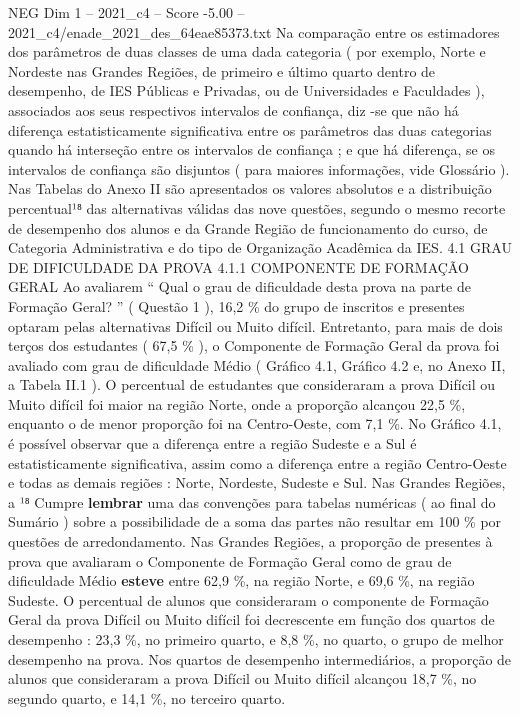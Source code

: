 \begin{textsample}{NEG Dim 1 – 2021\_c4 – Score -5.00 – 2021\_c4/enade\_2021\_des\_64eae85373.txt}
Na comparação entre os estimadores dos parâmetros de duas classes de uma dada categoria ( por exemplo, Norte e Nordeste nas Grandes Regiões, de primeiro e último quarto dentro de desempenho, de IES Públicas e Privadas, ou de Universidades e Faculdades ), associados aos seus respectivos intervalos de confiança, diz -se que não há diferença estatisticamente significativa entre os parâmetros das duas categorias quando há interseção entre os intervalos de confiança ; e que há diferença, se os intervalos de confiança são disjuntos ( para maiores informações, vide Glossário ).
Nas Tabelas do Anexo II são apresentados os valores absolutos e a distribuição percentual¹⁸ das alternativas válidas das nove questões, segundo o mesmo recorte de desempenho dos alunos e da Grande Região de funcionamento do curso, de Categoria Administrativa e do tipo de Organização Acadêmica da IES. 4.1 GRAU DE DIFICULDADE DA PROVA 4.1.1 COMPONENTE DE FORMAÇÃO GERAL Ao avaliarem “ Qual o grau de dificuldade desta prova na parte de Formação Geral? ” ( Questão 1 ), 16,2 \% do grupo de inscritos e presentes optaram pelas alternativas Difícil ou Muito difícil.
Entretanto, para mais de dois terços dos estudantes ( 67,5 \% ), o Componente de Formação Geral da prova foi avaliado com grau de dificuldade Médio ( Gráfico 4.1, Gráfico 4.2 e, no Anexo II, a Tabela II.1 ).
O percentual de estudantes que consideraram a prova Difícil ou Muito difícil foi maior na região Norte, onde a proporção alcançou 22,5 \%, enquanto o de menor proporção foi na Centro-Oeste, com 7,1 \%.
No Gráfico 4.1, é possível observar que a diferença entre a região Sudeste e a Sul é estatisticamente significativa, assim como a diferença entre a região Centro-Oeste e todas as demais regiões : Norte, Nordeste, Sudeste e Sul.
Nas Grandes Regiões, a ¹⁸ Cumpre \textbf{lembrar} uma das convenções para tabelas numéricas ( ao final do Sumário ) sobre a possibilidade de a soma das partes não resultar em 100 \% por questões de arredondamento.
Nas Grandes Regiões, a proporção de presentes à prova que avaliaram o Componente de Formação Geral como de grau de dificuldade Médio \textbf{esteve} entre 62,9 \%, na região Norte, e 69,6 \%, na região Sudeste.
O percentual de alunos que consideraram o componente de Formação Geral da prova Difícil ou Muito difícil foi decrescente em função dos quartos de desempenho : 23,3 \%, no primeiro quarto, e 8,8 \%, no quarto, o grupo de melhor desempenho na prova.
Nos quartos de desempenho intermediários, a proporção de alunos que consideraram a prova Difícil ou Muito difícil alcançou 18,7 \%, no segundo quarto, e 14,1 \%, no terceiro quarto.

\end{textsample}
